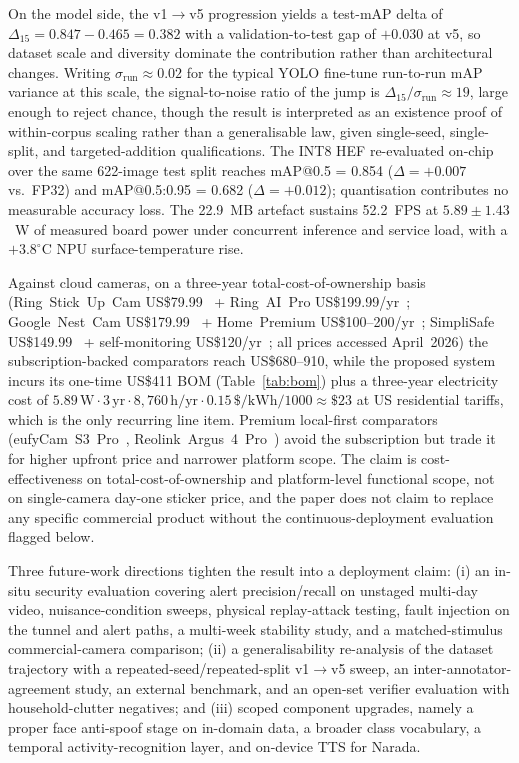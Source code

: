 \documentclass{ieeeaccess}
\begin{document}
On the model side, the v1$\rightarrow$v5 progression yields a test-mAP delta of $\Delta_{15} = 0.847 - 0.465 = 0.382$ with a validation-to-test gap of $+0.030$ at v5, so dataset scale and diversity dominate the contribution rather than architectural changes. Writing $\sigma_{\text{run}} \approx 0.02$ for the typical YOLO fine-tune run-to-run mAP variance at this scale, the signal-to-noise ratio of the jump is $\Delta_{15} / \sigma_{\text{run}} \approx 19$, large enough to reject chance, though the result is interpreted as an existence proof of within-corpus scaling rather than a generalisable law, given single-seed, single-split, and targeted-addition qualifications. The INT8 HEF re-evaluated on-chip over the same 622-image test split reaches mAP{@}0.5 = 0.854 ($\Delta = +0.007$ vs.\ FP32) and mAP{@}0.5:0.95 = 0.682 ($\Delta = +0.012$); quantisation contributes no measurable accuracy loss. The 22.9~MB artefact sustains 52.2~FPS at $5.89 \pm 1.43$~W of measured board power under concurrent inference and service load, with a $+3.8^\circ$C NPU surface-temperature rise.

Against cloud cameras, on a three-year total-cost-of-ownership basis (Ring~Stick~Up~Cam US\$79.99~\cite{b33} + Ring~AI~Pro US\$199.99/yr~\cite{b34}; Google~Nest~Cam US\$179.99~\cite{b35} + Home~Premium US\$100--200/yr~\cite{b36}; SimpliSafe US\$149.99~\cite{b37} + self-monitoring US\$120/yr~\cite{b38}; all prices accessed April~2026) the subscription-backed comparators reach US\$680--910, while the proposed system incurs its one-time US\$411 BOM (Table~\ref{tab:bom}) plus a three-year electricity cost of $5.89\,\mathrm{W} \cdot 3\,\mathrm{yr} \cdot 8{,}760\,\mathrm{h/yr} \cdot 0.15\,\$\mathrm{/kWh} / 1000 \approx \$23$ at US residential tariffs, which is the only recurring line item. Premium local-first comparators (eufyCam~S3~Pro~\cite{b39}, Reolink~Argus~4~Pro~\cite{b40}) avoid the subscription but trade it for higher upfront price and narrower platform scope. The claim is cost-effectiveness on total-cost-of-ownership and platform-level functional scope, not on single-camera day-one sticker price, and the paper does not claim to replace any specific commercial product without the continuous-deployment evaluation flagged below.

Three future-work directions tighten the result into a deployment claim: (i) an in-situ security evaluation covering alert precision/recall on unstaged multi-day video, nuisance-condition sweeps, physical replay-attack testing, fault injection on the tunnel and alert paths, a multi-week stability study, and a matched-stimulus commercial-camera comparison; (ii) a generalisability re-analysis of the dataset trajectory with a repeated-seed/repeated-split v1$\rightarrow$v5 sweep, an inter-annotator-agreement study, an external benchmark, and an open-set verifier evaluation with household-clutter negatives; and (iii) scoped component upgrades, namely a proper face anti-spoof stage on in-domain data, a broader class vocabulary, a temporal activity-recognition layer, and on-device TTS for Narada.
\end{document}
